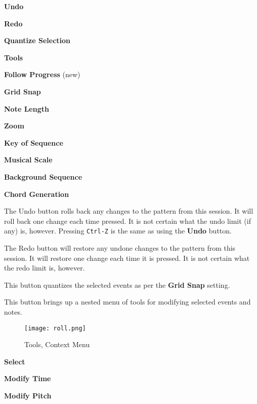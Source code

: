   \begin{enumber}
      \item \textbf{Undo}
      \item \textbf{Redo}
      \item \textbf{Quantize Selection}
      \item \textbf{Tools}
      \item \textbf{Follow Progress} (new)
      \item \textbf{Grid Snap}
      \item \textbf{Note Length}
      \item \textbf{Zoom}
      \item \textbf{Key of Sequence}
      \item \textbf{Musical Scale}
      \item \textbf{Background Sequence}
      \item \textbf{Chord Generation}
   \end{enumber}

   \setcounter{ItemCounter}{0}      %

   The Undo button rolls back any changes to the pattern from this session.
   It will roll back one change each time pressed.
   It is not certain what the undo limit (if any) is, however.
   Pressing \texttt{Ctrl-Z} is the same as using the \textbf{Undo} button.

   The Redo button will restore any undone changes to the pattern from this
   session.
   It will restore one change each time it is pressed.
   It is not certain what the redo limit is, however.

   This button quantizes the selected events as per
   the \textbf{Grid Snap} setting.

   This button brings up a nested menu of tools for modifying selected
   events and notes.

\begin{figure}[H]
   \centering 
   \texttt{[image: roll.png]}
   \caption{Tools, Context Menu}
   \label{fig:pattern_editor_tools_first_menu}
\end{figure}

   \begin{enumber}
      \item \textbf{Select}
      \item \textbf{Modify Time}
      \item \textbf{Modify Pitch}
   \end{enumber}

